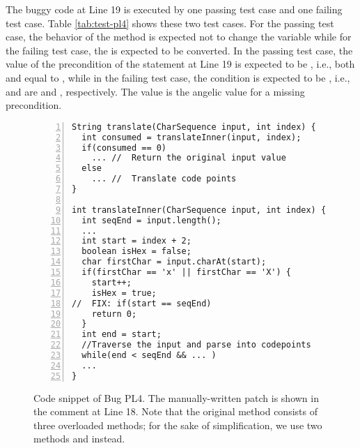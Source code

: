 The buggy code at Line 19 is executed by one passing test case and one failing test case. Table \ref{tab:test-pl4} shows these two test cases. For the passing test case, the behavior of the method is expected not to change the variable  while for the failing test case, the  is expected to be converted. In the passing test case, the value of the precondition of the statement at Line 19 is expected to be , i.e., both  and  equal to , while in the failing test case, the condition is expected to be , i.e.,  and  are  and , respectively. The  value is the angelic value for a missing precondition.   

\begin{figure}[!t]
\centering
\noindent\begin{minipage}{0.4\textwidth}
\begin{lstlisting}[numbers=left]
String translate(CharSequence input, int index) {
  int consumed = translateInner(input, index);
  if(consumed == 0)
    ... //  Return the original input value
  else
    ... //  Translate code points
}

int translateInner(CharSequence input, int index) {
  int seqEnd = input.length();
  ...
  int start = index + 2;
  boolean isHex = false;
  char firstChar = input.charAt(start);
  if(firstChar == 'x' || firstChar == 'X') {
    start++;
    isHex = true;
//  FIX: if(start == seqEnd)    
    return 0;
  }
  int end = start;
  //Traverse the input and parse into codepoints
  while(end < seqEnd && ... )
  ...  
}
\end{lstlisting}

\end{minipage}
\caption{Code snippet of Bug PL4. The manually-written patch is shown in the  comment at Line 18. Note that the original method  consists of three overloaded methods; for the sake of simplification, we use two methods  and  instead.}
\label{fig:bug-pl4}
\end{figure}

